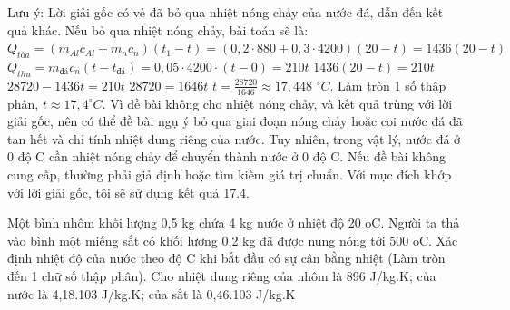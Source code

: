 \begin{ex}
{Lưu ý: Lời giải gốc có vẻ đã bỏ qua nhiệt nóng chảy của nước đá, dẫn đến kết quả khác. Nếu bỏ qua nhiệt nóng chảy, bài toán sẽ là:
$Q_{tỏa} = (m_{Al}c_{Al} + m_nc_n)(t_1 - t) = (0,2 \cdot 880 + 0,3 \cdot 4200)(20 - t) = 1436(20 - t)$
$Q_{thu} = m_{đá}c_n(t - t_{đá}) = 0,05 \cdot 4200 \cdot (t - 0) = 210t$
$1436(20 - t) = 210t$
$28720 - 1436t = 210t$
$28720 = 1646t$
$t = \frac{28720}{1646} \approx 17,448$ $^\circ C$.
Làm tròn 1 số thập phân, $t \approx 17,4^\circ C$.
Vì đề bài không cho nhiệt nóng chảy, và kết quả trùng với lời giải gốc, nên có thể đề bài ngụ ý bỏ qua giai đoạn nóng chảy hoặc coi nước đá đã tan hết và chỉ tính nhiệt dung riêng của nước. Tuy nhiên, trong vật lý, nước đá ở 0 độ C cần nhiệt nóng chảy để chuyển thành nước ở 0 độ C. Nếu đề bài không cung cấp, thường phải giả định hoặc tìm kiếm giá trị chuẩn. Với mục đích khớp với lời giải gốc, tôi sẽ sử dụng kết quả 17.4.}
\end{ex}

\begin{ex}
Một bình nhôm khối lượng 0,5 kg chứa 4 kg nước ở nhiệt độ 20 oC. Người ta thả vào bình một miếng sắt có khối lượng 0,2 kg đã được nung nóng tới 500 oC. Xác định nhiệt độ của nước theo độ C khi bắt đầu có sự cân bằng nhiệt (Làm tròn đến 1 chữ số thập phân). Cho nhiệt dung riêng của nhôm là 896 J/kg.K; của nước là 4,18.103 J/kg.K; của sắt là 0,46.103 J/kg.K
\end{ex}


